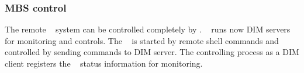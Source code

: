 \subsubsection{MBS control}
The remote \mbs~ system can be controlled completely by \dabc.
\mbs~ runs now DIM servers for monitoring and controls.
The \mbs~ is started by remote shell commands and controlled by
sending commands to DIM server. The controlling process as a DIM client
registers the \mbs~ status information for monitoring.
